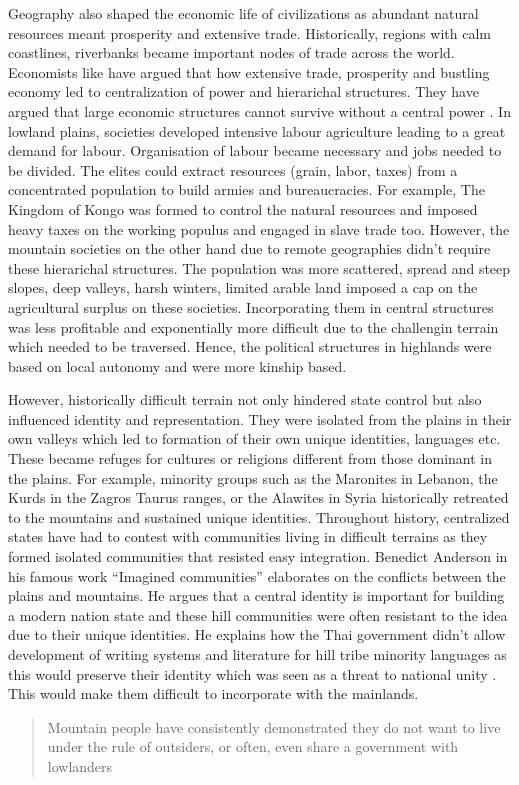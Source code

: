 Geography also shaped the economic life of civilizations as abundant natural resources meant prosperity and extensive trade. Historically, regions with calm coastlines, riverbanks became important nodes of trade across the world. Economists like \cite{smith1937wealth} have argued that how extensive trade, prosperity and bustling economy led to centralization of power and hierarichal structures. They have argued that large economic structures cannot survive without a central power \citep{robinson2012nations}. In lowland plains, societies developed intensive labour agriculture leading to a great demand for labour. Organisation of labour became necessary and jobs needed to be divided. The elites could extract resources (grain, labor, taxes) from a concentrated population to build armies and bureaucracies. For example, The Kingdom of Kongo was formed to control the natural resources and imposed heavy taxes on the working populus and engaged in slave trade too. However, the mountain societies on the other hand due to remote geographies didn't require these hierarichal structures. The population was more scattered, spread and  steep slopes, deep valleys, harsh winters, limited arable land imposed a cap on the agricultural surplus on these societies. Incorporating them in central structures was less profitable and exponentially more difficult due to the challengin terrain which needed to be traversed. Hence, the political structures in highlands were based on local autonomy and were more kinship based.

\vspace{0.3cm}

However, historically difficult terrain not only hindered state control but also influenced identity and representation. They were isolated from the plains in their own valleys which led to formation of their own unique identities, languages etc. These became refuges for cultures or religions different from those dominant in the plains. For example, minority groups such as the Maronites in Lebanon, the Kurds in the Zagros Taurus ranges, or the Alawites in Syria historically retreated to the mountains and sustained unique identities.
 Throughout history, centralized states have had to contest with communities living in difficult terrains as they formed isolated communities that resisted easy integration. Benedict Anderson in his famous work ``Imagined communities'' elaborates on the conflicts between the plains and mountains. He argues that a central identity is important for building a modern nation state and these hill communities were often resistant to the idea due to their unique identities. He explains how the Thai government didn't allow development of writing systems and literature for hill tribe minority languages as this would preserve their identity which was seen as a threat to national unity \citep{anderson1991imagined}. This would make them difficult to incorporate with the mainlands.  \begin{quote} Mountain people have consistently demonstrated they do not want to live under the rule of outsiders, or often, even share a government with lowlanders\end{quote} 

